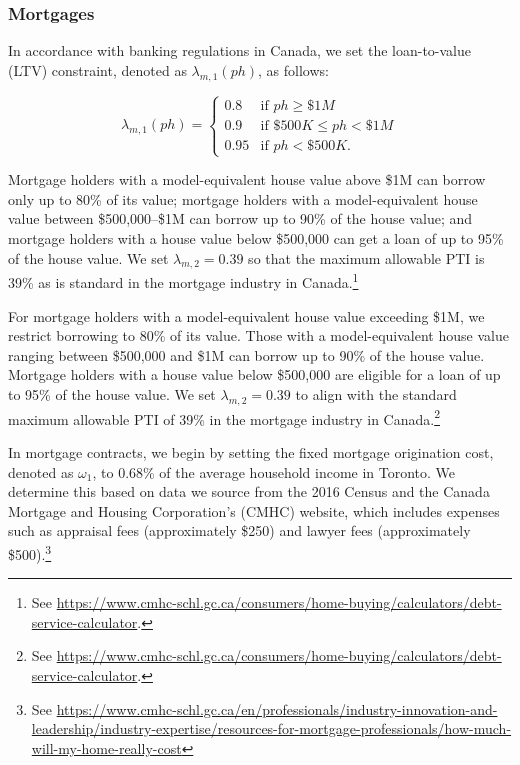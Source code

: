 \documentclass[parskip=full]{article}
\begin{document}
\subsubsection{Mortgages}

In accordance with banking regulations in Canada, we set the loan-to-value (LTV) constraint, denoted as $\lambda_{m,1}(ph)$, as follows:

\begin{equation*}
\lambda_{m,1}(ph) = \begin{cases}
0.8 &\text{if $ph\geq \$1M$}\\
0.9 &\text{if $\$500K\leq ph< \$1M$}\\
0.95 &\text{if $ph < \$500K$}.
\end{cases}
\end{equation*}

\noindent Mortgage holders with a model-equivalent house value above \$1M can borrow only up to 80\% of its value; mortgage holders with a model-equivalent house value between \$500,000--\$1M can borrow up to 90\% of the house value; and mortgage holders with a house value below \$500,000 can get a loan of up to 95\% of the house value. We set $\lambda_{m,2}=0.39$ so that the maximum allowable PTI is 39\% as is standard in the mortgage industry in Canada.\footnote{See \url{https://www.cmhc-schl.gc.ca/consumers/home-buying/calculators/debt-service-calculator}.}

For mortgage holders with a model-equivalent house value exceeding \$1M, we restrict borrowing to 80\% of its value. Those with a model-equivalent house value ranging between \$500,000 and \$1M can borrow up to 90\% of the house value. Mortgage holders with a house value below \$500,000 are eligible for a loan of up to 95\% of the house value. We set $\lambda_{m,2}=0.39$ to align with the standard maximum allowable PTI of 39\% in the mortgage industry in Canada.\footnote{See \url{https://www.cmhc-schl.gc.ca/consumers/home-buying/calculators/debt-service-calculator}.}

In mortgage contracts, we begin by setting the fixed mortgage origination cost, denoted as $\omega_{1}$, to 0.68\% of the average household income in Toronto. We determine this based on data we source from the 2016 Census and the Canada Mortgage and Housing Corporation's (CMHC) website, which includes expenses such as appraisal fees (approximately \$250) and lawyer fees (approximately \$500).\footnote{See \url{https://www.cmhc-schl.gc.ca/en/professionals/industry-innovation-and-leadership/industry-expertise/resources-for-mortgage-professionals/how-much-will-my-home-really-cost}}
\end{document}
